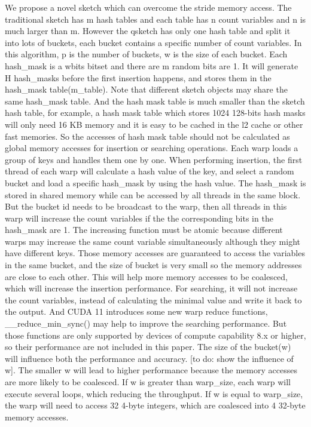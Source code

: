 \documentclass[conference]{IEEEtran}
\begin{document}
We propose a novel sketch which can overcome the stride memory access. The traditional sketch has m hash tables and each table has n count variables and n is much larger than m. However the qsketch has only one hash table and split it into lots of buckets, each bucket contains a specific number of count variables. In this algorithm, p is the number of buckets, w is the size of each bucket. Each hash\_mask is a w\-bits bitset and there are m random bits are 1. It will generate H hash\_masks before the first insertion happens, and stores them in the hash\_mask table(m\_table). Note that different sketch objects may share the same hash\_mask table. And the hash mask table is much smaller than the sketch hash table, for example, a hash mask table which stores 1024 128-bits hash masks will only need 16 KB memory and it is easy to be cached in the l2 cache or other fast memories. So the accesses of hash mask table should not be calculated as global memory accesses for insertion or searching operations.
Each warp loads a group of keys and handles them one by one. When performing insertion, the first thread of each warp will calculate a hash value of the key, and select a random bucket and load a specific hash\_mask by using the hash value. The hash\_mask is stored in shared memory while can be accessed by all threads in the same block. But the bucket id needs to be broadcast to the warp, then all threads in this warp will increase the count variables if the the corresponding bits in the hash\_mask are 1. The increasing function must be atomic because different warps may increase the same count variable simultaneously although they might have different keys. Those memory accesses are guaranteed to access the variables in the same bucket, and the size of bucket is very small so the memory addresses are close to each other. This will help more memory accesses to be coalesced, which will increase the insertion performance. 
For searching, it will not increase the count variables, instead of calculating the minimal value and write it back to the output. And CUDA 11 introduces some new warp reduce functions, \_\_reduce\_min\_sync() may help to improve the searching performance. But those functions are only supported by devices of compute capability 8.x or higher, so their performance are not included in this paper.
The size of the bucket(w) will influence both the performance and accuracy. [to do: show the influence of w]. The smaller w will lead to higher performance because the memory accesses are more likely to be coalesced. If w is greater than warp\_size, each warp will execute several loops, which reducing the throughput. If w is equal to warp\_size, the warp will need to access 32 4-byte integers, which are coalesced into 4 32-byte memory accesses.
\end{document}
